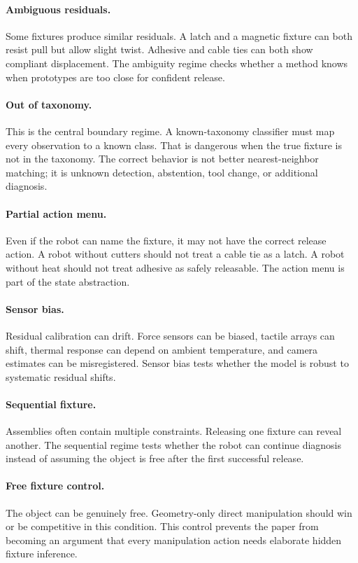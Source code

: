 \documentclass{article}
\begin{document}
\paragraph{Ambiguous residuals.}
Some fixtures produce similar residuals. A latch and a magnetic fixture can
both resist pull but allow slight twist. Adhesive and cable ties can both show
compliant displacement. The ambiguity regime checks whether a method knows
when prototypes are too close for confident release.

\paragraph{Out of taxonomy.}
This is the central boundary regime. A known-taxonomy classifier must map every
observation to a known class. That is dangerous when the true fixture is not in
the taxonomy. The correct behavior is not better nearest-neighbor matching; it
is unknown detection, abstention, tool change, or additional diagnosis.

\paragraph{Partial action menu.}
Even if the robot can name the fixture, it may not have the correct release
action. A robot without cutters should not treat a cable tie as a latch. A
robot without heat should not treat adhesive as safely releasable. The action
menu is part of the state abstraction.

\paragraph{Sensor bias.}
Residual calibration can drift. Force sensors can be biased, tactile arrays can
shift, thermal response can depend on ambient temperature, and camera estimates
can be misregistered. Sensor bias tests whether the model is robust to
systematic residual shifts.

\paragraph{Sequential fixture.}
Assemblies often contain multiple constraints. Releasing one fixture can reveal
another. The sequential regime tests whether the robot can continue diagnosis
instead of assuming the object is free after the first successful release.

\paragraph{Free fixture control.}
The object can be genuinely free. Geometry-only direct manipulation should win
or be competitive in this condition. This control prevents the paper from
becoming an argument that every manipulation action needs elaborate hidden
fixture inference.
\end{document}
